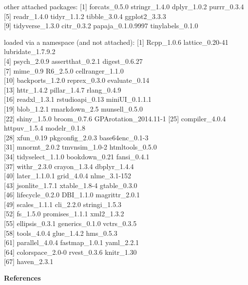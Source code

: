\begin{appendix}
other attached packages: {[}1{]} forcats\_0.5.0 stringr\_1.4.0
dplyr\_1.0.2 purrr\_0.3.4\\
{[}5{]} readr\_1.4.0 tidyr\_1.1.2 tibble\_3.0.4 ggplot2\_3.3.3\\
{[}9{]} tidyverse\_1.3.0 citr\_0.3.2 papaja\_0.1.0.9997
tinylabels\_0.1.0

loaded via a namespace (and not attached): {[}1{]} Rcpp\_1.0.6
lattice\_0.20-41 lubridate\_1.7.9.2\\
{[}4{]} psych\_2.0.9 assertthat\_0.2.1 digest\_0.6.27\\
{[}7{]} mime\_0.9 R6\_2.5.0 cellranger\_1.1.0\\
{[}10{]} backports\_1.2.0 reprex\_0.3.0 evaluate\_0.14\\
{[}13{]} httr\_1.4.2 pillar\_1.4.7 rlang\_0.4.9\\
{[}16{]} readxl\_1.3.1 rstudioapi\_0.13 miniUI\_0.1.1.1\\
{[}19{]} blob\_1.2.1 rmarkdown\_2.5 munsell\_0.5.0\\
{[}22{]} shiny\_1.5.0 broom\_0.7.6 GPArotation\_2014.11-1 {[}25{]}
compiler\_4.0.4 httpuv\_1.5.4 modelr\_0.1.8\\
{[}28{]} xfun\_0.19 pkgconfig\_2.0.3 base64enc\_0.1-3\\
{[}31{]} mnormt\_2.0.2 tmvnsim\_1.0-2 htmltools\_0.5.0\\
{[}34{]} tidyselect\_1.1.0 bookdown\_0.21 fansi\_0.4.1\\
{[}37{]} withr\_2.3.0 crayon\_1.3.4 dbplyr\_1.4.4\\
{[}40{]} later\_1.1.0.1 grid\_4.0.4 nlme\_3.1-152\\
{[}43{]} jsonlite\_1.7.1 xtable\_1.8-4 gtable\_0.3.0\\
{[}46{]} lifecycle\_0.2.0 DBI\_1.1.0 magrittr\_2.0.1\\
{[}49{]} scales\_1.1.1 cli\_2.2.0 stringi\_1.5.3\\
{[}52{]} fs\_1.5.0 promises\_1.1.1 xml2\_1.3.2\\
{[}55{]} ellipsis\_0.3.1 generics\_0.1.0 vctrs\_0.3.5\\
{[}58{]} tools\_4.0.4 glue\_1.4.2 hms\_0.5.3\\
{[}61{]} parallel\_4.0.4 fastmap\_1.0.1 yaml\_2.2.1\\
{[}64{]} colorspace\_2.0-0 rvest\_0.3.6 knitr\_1.30\\
{[}67{]} haven\_2.3.1

\newpage

\noindent  \textbf{References}


\end{appendix}

